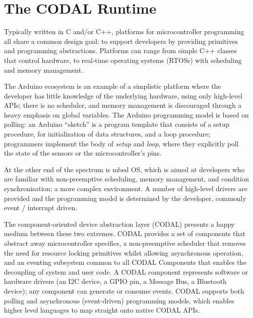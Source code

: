 \section{The CODAL Runtime}
\label{sec:codal}



Typically written in C and/or C++, platforms for microcontroller programming all share a common design goal: to support developers by providing primitives and programming abstractions. Platforms can range from simple C++ classes that control hardware, to real-time operating systems (RTOSs) with scheduling and memory management.

The Arduino ecosystem is an example of a simplistic platform where the developer has little knowledge of the underlying hardware, using only high-level APIs; there is no scheduler, and memory management is discouraged through a heavy emphasis on global variables.  The Arduino programming model is based on polling: an Arduino ``sketch'' is a program template that consists of a setup procedure, for initialization of data structures, and a loop procedure; programmers implement the body of \textit{setup} and \textit{loop}, where they explicitly poll the state of the sensors or the microcontroller's pins.

At the other end of the spectrum is mbed OS, which is aimed at developers who are familiar with non-preemptive scheduling, memory management, and condition synchronisation; a more complex environment. A number of high-level drivers are provided and the programming model is determined by the developer, commonly event / interrupt driven.

The component-oriented device abstraction layer (CODAL) presents a happy medium between these two extremes. CODAL provides a set of components that abstract away microcontroller specifics, a non-preemptive scheduler that removes the need for resource locking primitives whilst allowing asynchronous operation, and an eventing subsystem common to all CODAL Components that enables the decoupling of system and user code. A CODAL component represents software or hardware drivers (an I2C device, a GPIO pin, a Message Bus, a Bluetooth device); any component can generate or consume events. CODAL supports both polling and asynchronous (event-driven) programming models, which enables higher level languages to map straight onto native CODAL APIs.

